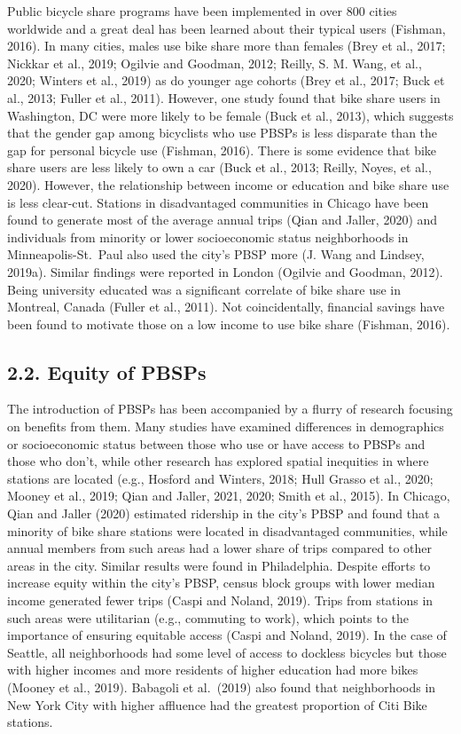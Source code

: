 \documentclass[]{elsarticle} %
\begin{document}
Public bicycle share programs have been implemented in over 800 cities
worldwide and a great deal has been learned about their typical users
(Fishman, 2016). In many cities, males use bike share more than females
(Brey et al., 2017; Nickkar et al., 2019; Ogilvie and Goodman, 2012;
Reilly, S. M. Wang, et al., 2020; Winters et al., 2019) as do younger
age cohorts (Brey et al., 2017; Buck et al., 2013; Fuller et al., 2011).
However, one study found that bike share users in Washington, DC were
more likely to be female (Buck et al., 2013), which suggests that the
gender gap among bicyclists who use PBSPs is less disparate than the gap
for personal bicycle use (Fishman, 2016). There is some evidence that
bike share users are less likely to own a car (Buck et al., 2013;
Reilly, Noyes, et al., 2020). However, the relationship between income
or education and bike share use is less clear-cut. Stations in
disadvantaged communities in Chicago have been found to generate most of
the average annual trips (Qian and Jaller, 2020) and individuals from
minority or lower socioeconomic status neighborhoods in
Minneapolis-St.~Paul also used the city's PBSP more (J. Wang and
Lindsey, 2019a). Similar findings were reported in London (Ogilvie and
Goodman, 2012). Being university educated was a significant correlate of
bike share use in Montreal, Canada (Fuller et al., 2011). Not
coincidentally, financial savings have been found to motivate those on a
low income to use bike share (Fishman, 2016).

\hypertarget{equity-of-pbsps}{%
\subsection{2.2. Equity of PBSPs}\label{equity-of-pbsps}}

The introduction of PBSPs has been accompanied by a flurry of research
focusing on benefits from them. Many studies have examined differences
in demographics or socioeconomic status between those who use or have
access to PBSPs and those who don't, while other research has explored
spatial inequities in where stations are located (e.g., Hosford and
Winters, 2018; Hull Grasso et al., 2020; Mooney et al., 2019; Qian and
Jaller, 2021, 2020; Smith et al., 2015). In Chicago, Qian and Jaller
(2020) estimated ridership in the city's PBSP and found that a minority
of bike share stations were located in disadvantaged communities, while
annual members from such areas had a lower share of trips compared to
other areas in the city. Similar results were found in Philadelphia.
Despite efforts to increase equity within the city's PBSP, census block
groups with lower median income generated fewer trips (Caspi and Noland,
2019). Trips from stations in such areas were utilitarian (e.g.,
commuting to work), which points to the importance of ensuring equitable
access (Caspi and Noland, 2019). In the case of Seattle, all
neighborhoods had some level of access to dockless bicycles but those
with higher incomes and more residents of higher education had more
bikes (Mooney et al., 2019). Babagoli et al.~(2019) also found that
neighborhoods in New York City with higher affluence had the greatest
proportion of Citi Bike stations.
\end{document}

